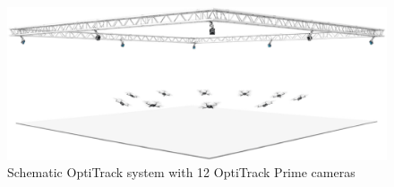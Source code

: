 \begin{figure}[!htb]
	\centering
	\includegraphics[width=1\textwidth]{"contents/images/03-optitrack-schema"}
	\caption[Schematic OptiTrack system with 12 OptiTrack Prime cameras]{Schematic OptiTrack system with 12 OptiTrack Prime cameras}
	\label{fig:optitrack-schema}
\end{figure}


